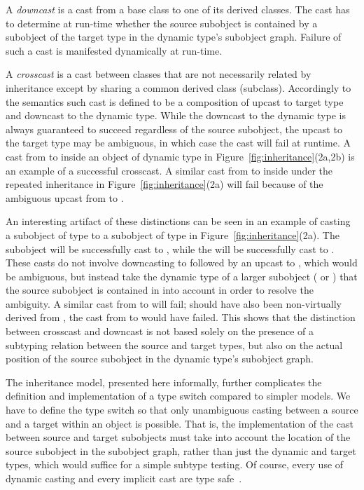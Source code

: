 A \emph{downcast} is a cast from a base class to one of its derived classes. The 
cast has to determine at run-time whether the source subobject is contained by a 
subobject of the target type in the dynamic type's subobject graph. Failure 
of such a cast is manifested dynamically at run-time.

A \emph{crosscast} is a cast between classes that are not necessarily related by 
inheritance except by sharing a common derived class (subclass).
Accordingly to the \Cpp{} semantics such cast is defined to be a 
composition of upcast to target type and downcast to the dynamic type. 
While the downcast to the dynamic type is always guaranteed to succeed 
regardless of the source subobject, the upcast to the target type may be 
ambiguous, in which case the cast will fail at runtime. A cast from  to 
 inside an object of dynamic type  in 
Figure~\ref{fig:inheritance}(2a,2b) is an example of a successful crosscast. A 
similar cast from  to  inside  under the repeated  
inheritance in Figure~\ref{fig:inheritance}(2a) will fail because of the ambiguous 
upcast from  to .

An interesting artifact of these distinctions can be seen in an example of 
casting a subobject of type  to a subobject of type  in 
Figure~\ref{fig:inheritance}(2a). The subobject  will be 
successfully cast to , while the  will be 
successfully cast to . These casts do not involve downcasting to 
 followed by an upcast to , which would be ambiguous, but 
instead take the dynamic type of a larger subobject ( or ) 
that the source subobject is contained in into account in order to resolve the 
ambiguity. A similar cast from  to  will fail; should 
 have also been non-virtually derived from , the cast from 
 to  would have failed. This shows that the distinction 
between crosscast and downcast is not based solely on the presence of a 
subtyping relation between the source and target types, but also on the actual 
position of the source subobject in the dynamic type's subobject graph.

The \Cpp{} inheritance model, presented here informally, further complicates the definition and
implementation of a type switch compared to simpler models. We have to define the
type switch so that only unambiguous casting between a source and a target within an object is possible.
That is, the implementation of the cast between source and target subobjects must take into account the
location of the source subobject in the subobject graph, rather than
just the dynamic and target types, which would suffice for a simple subtype testing.
Of course, every use of dynamic casting and every implicit cast are type safe~\cite{WNST06}.

